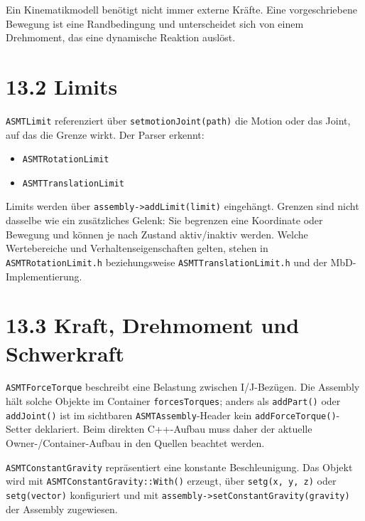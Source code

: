 \documentclass[
  12pt
]{book}
\providecommand{\tightlist}{%
  \setlength{\itemsep}{0pt}\setlength{\parskip}{0pt}}
\begin{document}
Ein Kinematikmodell benötigt nicht immer externe Kräfte. Eine
vorgeschriebene Bewegung ist eine Randbedingung und unterscheidet sich
von einem Drehmoment, das eine dynamische Reaktion auslöst.

\hypertarget{limits}{%
\section{\texorpdfstring{{13.2} Limits}{13.2 Limits}}\label{limits}}

\texttt{ASMTLimit} referenziert über \texttt{setmotionJoint(path)} die
Motion oder das Joint, auf das die Grenze wirkt. Der Parser erkennt:

\begin{itemize}
\tightlist
\item
  \texttt{ASMTRotationLimit}
\item
  \texttt{ASMTTranslationLimit}
\end{itemize}

Limits werden über \texttt{assembly-\textgreater{}addLimit(limit)}
eingehängt. Grenzen sind nicht dasselbe wie ein zusätzliches Gelenk: Sie
begrenzen eine Koordinate oder Bewegung und können je nach Zustand
aktiv/inaktiv werden. Welche Wertebereiche und Verhaltenseigenschaften
gelten, stehen in \texttt{ASMTRotationLimit.h} beziehungsweise
\texttt{ASMTTranslationLimit.h} und der MbD-Implementierung.

\hypertarget{kraft-drehmoment-und-schwerkraft}{%
\section{\texorpdfstring{{13.3} Kraft, Drehmoment und
Schwerkraft}{13.3 Kraft, Drehmoment und Schwerkraft}}\label{kraft-drehmoment-und-schwerkraft}}

\texttt{ASMTForceTorque} beschreibt eine Belastung zwischen I/J-Bezügen.
Die Assembly hält solche Objekte im Container \texttt{forcesTorques};
anders als \texttt{addPart()} oder \texttt{addJoint()} ist im sichtbaren
\texttt{ASMTAssembly}-Header kein \texttt{addForceTorque()}-Setter
deklariert. Beim direkten C++-Aufbau muss daher der aktuelle
Owner-/Container-Aufbau in den Quellen beachtet werden.

\texttt{ASMTConstantGravity} repräsentiert eine konstante
Beschleunigung. Das Objekt wird mit \texttt{ASMTConstantGravity::With()}
erzeugt, über \texttt{setg(x,\ y,\ z)} oder \texttt{setg(vector)}
konfiguriert und mit
\texttt{assembly-\textgreater{}setConstantGravity(gravity)} der Assembly
zugewiesen.
\end{document}
